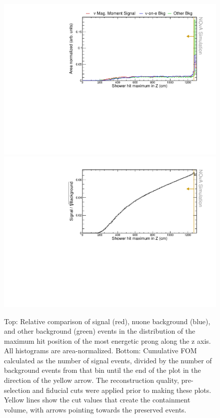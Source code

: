\begin{figure}[hbtp]
\centering
\includegraphics[width=.9\textwidth]{Plots/NuMMEventSelection/N1Cut_maxZ.pdf}
\includegraphics[width=.9\textwidth]{Plots/NuMMEventSelection/NuMM_N1Cut_maxZleft_FOMStats}
\caption[Hit maximum z containment cut]{Top: Relative comparison of signal (red), \acrshort{nuone} background (blue), and other background (green) events in the distribution of the maximum hit position of the most energetic prong along the z axis. All histograms are area-normalized. Bottom: Cumulative \acrshort{FOM} calculated as the number of signal events, divided by the number of background events from that bin until the end of the plot in the direction of the yellow arrow. The reconstruction quality, pre-selection and fiducial cuts were applied prior to making these plots. Yellow lines show the cut values that create the containment volume, with arrows pointing towards the preserved events.}
\label{fig:NuMMContainmentCutMaxZ}
\end{figure}


